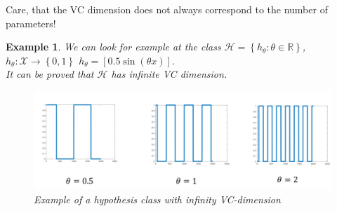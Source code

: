 \documentclass[12pt]{report}
\theoremstyle{plain}
\newtheorem{EX}{Example}
\newcommand\mcl[1]{\mathcal{#1}}
\begin{document}
\begin{flushleft}
Care, that the VC dimension does not always correspond to the number of 
parameters!
\begin{EX}
	We can look for example at the class 
	$\mcl{H}=\left\{h_\theta:\theta\in\mathds{R}\right\}$, 
	$h_\theta:\mcl{X}\to\left\{0,1\right\}$ $h_\theta=\left[0.5\sin(\theta 
	x)\right]$.\\
	It can be proved that $\mcl{H}$ has infinite VC dimension.
	\begin{figure}[!h]
		\centering
		\includegraphics[scale=0.6]{images/ex_infty_VCdim.pdf}
		\caption{Example of a hypothesis class with infinity VC-dimension}
	\end{figure}
\end{EX}


\end{flushleft}
\end{document}
